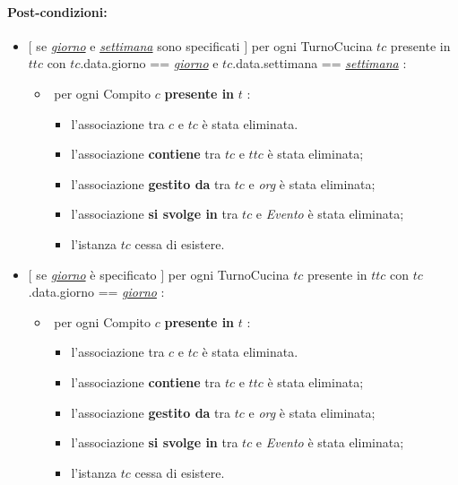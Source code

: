 \paragraph{Post-condizioni:} 
\begin{itemize}
   \item $[$ se \underline{\textit{giorno}} e \underline{\textit{settimana}} sono specificati $]$ \textlangle per ogni TurnoCucina $tc$ presente in $ttc$ con $tc$.data.giorno == \underline{\textit{giorno}} e $tc$.data.settimana == \underline{\textit{settimana}} \textrangle:
\begin{itemize}
   \item \textlangle $ $ per ogni Compito $c$ \textbf{presente in} $t$ \textrangle:
    \begin{itemize}
        \item l'associazione tra $c$ e $tc$ è stata eliminata.
    \item l'associazione \textbf{contiene} tra $tc$ e $ttc$ è stata eliminata;
    \item l'associazione \textbf{gestito da} tra $tc$ e \textit{org} è stata eliminata;
\item l'associazione \textbf{si svolge in} tra $tc$ e \textit{Evento} è stata eliminata;
    \item l'istanza $tc$ cessa di esistere.
    \end{itemize}
\end{itemize}
   \item $[$ se \underline{\textit{giorno}} è specificato $]$ \textlangle per ogni TurnoCucina $tc$ presente in $ttc$ con $tc$.data.giorno == \underline{\textit{giorno}} \textrangle:
\begin{itemize}
   \item \textlangle $ $ per ogni Compito $c$ \textbf{presente in} $t$ \textrangle:
    \begin{itemize}
        \item l'associazione tra $c$ e $tc$ è stata eliminata.
    \item l'associazione \textbf{contiene} tra $tc$ e $ttc$ è stata eliminata;
    \item l'associazione \textbf{gestito da} tra $tc$ e \textit{org} è stata eliminata;
\item l'associazione \textbf{si svolge in} tra $tc$ e \textit{Evento} è stata eliminata;
    \item l'istanza $tc$ cessa di esistere.
    \end{itemize}
\end{itemize}


\end{itemize}

